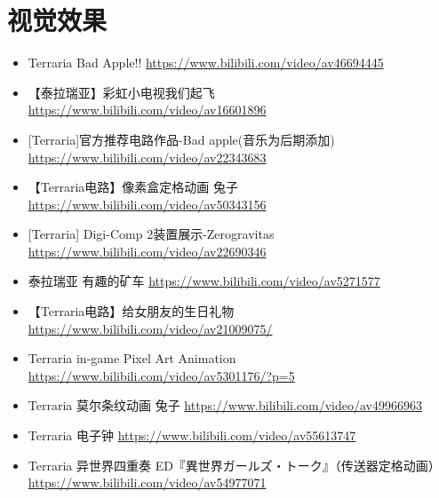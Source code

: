 \section{视觉效果}
\begin{itemize}
\item Terraria Bad Apple!! \url{https://www.bilibili.com/video/av46694445}
\item 【泰拉瑞亚】彩虹小电视我们起飞 \url{https://www.bilibili.com/video/av16601896}
\item {[}Terraria]官方推荐电路作品-Bad apple(音乐为后期添加) \url{https://www.bilibili.com/video/av22343683}
\item 【Terraria电路】像素盒定格动画 兔子 \url{https://www.bilibili.com/video/av50343156}
\item {[}Terraria] Digi-Comp 2装置展示-Zerogravitas \url{https://www.bilibili.com/video/av22690346}
\item 泰拉瑞亚 有趣的矿车 \url{https://www.bilibili.com/video/av5271577}
\item 【Terraria电路】给女朋友的生日礼物 \url{https://www.bilibili.com/video/av21009075/}
\item Terraria in-game Pixel Art Animation \url{https://www.bilibili.com/video/av5301176/?p=5}
\item Terraria 莫尔条纹动画 兔子 \url{https://www.bilibili.com/video/av49966963}
\item Terraria 电子钟 \url{https://www.bilibili.com/video/av55613747}
\item Terraria 异世界四重奏 ED『異世界ガールズ・トーク』（传送器定格动画） \url{https://www.bilibili.com/video/av54977071}
\end{itemize}

